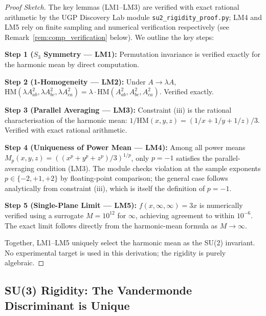 \documentclass[11pt,twocolumn]{article}
\begin{document}
\begin{proof}[Proof Sketch]
The key lemmas (LM1–LM3) are verified with exact rational arithmetic by the UGP Discovery Lab module \texttt{su2\_rigidity\_proof.py}; LM4 and LM5 rely on finite sampling and numerical verification respectively (see Remark~\ref{rem:comp_verification} below). We outline the key steps:

\textbf{Step 1 ($S_3$ Symmetry — LM1):}
Permutation invariance is verified exactly for the harmonic mean by direct computation.

\textbf{Step 2 (1-Homogeneity — LM2):}
Under $A \to \lambda A$, $\mathrm{HM}(\lambda A_{ab}^2, \lambda A_{bc}^2, \lambda A_{ca}^2) = \lambda \cdot \mathrm{HM}(A_{ab}^2, A_{bc}^2, A_{ca}^2)$. Verified exactly.

\textbf{Step 3 (Parallel Averaging — LM3):}
Constraint (iii) is the rational characterisation of the harmonic mean: $1/\mathrm{HM}(x,y,z) = (1/x + 1/y + 1/z)/3$. Verified with exact rational arithmetic.

\textbf{Step 4 (Uniqueness of Power Mean — LM4):}
Among all power means $M_p(x,y,z) = ((x^p+y^p+z^p)/3)^{1/p}$, only $p = -1$ satisfies the parallel-averaging condition (LM3). The module checks violation at the sample exponents $p\in\{-2,+1,+2\}$ by floating-point comparison; the general case follows analytically from constraint (iii), which is itself the definition of $p=-1$.

\textbf{Step 5 (Single-Plane Limit — LM5):}
$f(x, \infty, \infty) = 3x$ is numerically verified using a surrogate $M = 10^{12}$ for $\infty$, achieving agreement to within $10^{-6}$. The exact limit follows directly from the harmonic-mean formula as $M \to \infty$.

Together, LM1–LM5 uniquely select the harmonic mean as the SU(2) invariant. No experimental target is used in this derivation; the rigidity is purely algebraic.
\end{proof}

\subsection{SU(3) Rigidity: The Vandermonde Discriminant is Unique}
\label{app:su3_rigidity}
\end{document}
